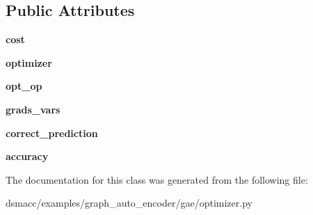 \subsection*{Public Attributes}
\begin{DoxyCompactItemize}
\item 
\mbox{\label{classdsmacc_1_1examples_1_1graph__auto__encoder_1_1gae_1_1optimizer_1_1OptimizerAE_a64a17d4ea53d13558fe402cd1c072462}} 
{\bfseries cost}
\item 
\mbox{\label{classdsmacc_1_1examples_1_1graph__auto__encoder_1_1gae_1_1optimizer_1_1OptimizerAE_a9f23aecf53b9a248765d7b5f91c4e173}} 
{\bfseries optimizer}
\item 
\mbox{\label{classdsmacc_1_1examples_1_1graph__auto__encoder_1_1gae_1_1optimizer_1_1OptimizerAE_a5471b239b299f673374207365c1c1bf4}} 
{\bfseries opt\+\_\+op}
\item 
\mbox{\label{classdsmacc_1_1examples_1_1graph__auto__encoder_1_1gae_1_1optimizer_1_1OptimizerAE_adb3ab4747c10e00a0ac02c68b60ef157}} 
{\bfseries grads\+\_\+vars}
\item 
\mbox{\label{classdsmacc_1_1examples_1_1graph__auto__encoder_1_1gae_1_1optimizer_1_1OptimizerAE_a58495500ff7d5fe417e721974b0fd492}} 
{\bfseries correct\+\_\+prediction}
\item 
\mbox{\label{classdsmacc_1_1examples_1_1graph__auto__encoder_1_1gae_1_1optimizer_1_1OptimizerAE_a6f1693fa82eed840410e3ad4d2835826}} 
{\bfseries accuracy}
\end{DoxyCompactItemize}


The documentation for this class was generated from the following file\+:\begin{DoxyCompactItemize}
\item 
dsmacc/examples/graph\+\_\+auto\+\_\+encoder/gae/optimizer.\+py\end{DoxyCompactItemize}
